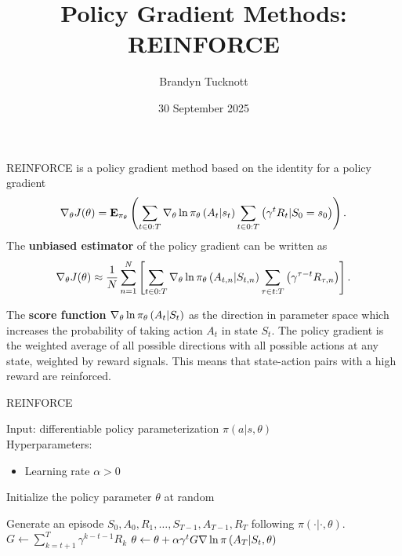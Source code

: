 \documentclass{exam}
\title{Policy Gradient Methods: REINFORCE}
\author{Brandyn Tucknott}
\date{30 September 2025}
\begin{document}
\maketitle

REINFORCE is a policy gradient method based on the identity for a policy gradient
$$\nabla_\theta J(\theta) = \mathbf{E}_{\pi_\theta}\left( \sum_{t\in0:T} \nabla_\theta \ln \pi_\theta\left( A_t | s_t \right)\sum_{t\in 0:T} \left( \gamma^tR_t | S_0 = s_0 \right) \right).$$
The \textbf{unbiased estimator} of the policy gradient can be written as
$$\nabla_\theta J(\theta) \approx \frac{1}{N}\sum_{n = 1}^N \left[ \sum_{t\in 0:T} \nabla_\theta \ln \pi_\theta\left( A_{t, n} | S_{t, n} \right)\sum_{\tau\in t:T} \left( \gamma^{\tau - t}R_{\tau, n} \right) \right].$$

The \textbf{score function} $\nabla_\theta \ln \pi_\theta\left( A_t | S_t \right)$ as the direction in parameter space which increases the probability
of taking action $A_t$ in state $S_t$. The policy gradient is the weighted average of all possible directions with all possible actions
at any state, weighted by reward signals. This means that state-action pairs with a high reward are reinforced.

\begin{algorithm}
    \caption{REINFORCE}
    Input: differentiable policy parameterization $\pi (a | s, \theta)$ \\
    Hyperparameters:
    \begin{itemize}
        \item Learning rate $\alpha > 0$
    \end{itemize}
    Initialize the policy parameter $\theta$ at random

    \begin{algorithmic}[1]
            \State Generate an episode $S_0, A_0, R_1, \hdots, S_{T - 1}, A_{T - 1}, R_T$ following $\pi (\cdot | \cdot, \theta)$.
                \State $G \gets \sum_{k = t + 1}^T \gamma^{k - t - 1}R_k$
                \State $\theta \gets \theta + \alpha \gamma^tG\nabla \ln \pi\left( A_T | S_t, \theta \right)$
    \end{algorithmic}
\end{algorithm}
\end{document}

